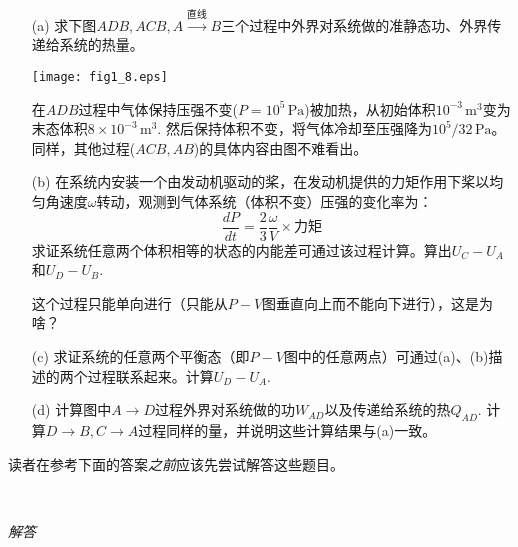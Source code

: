\begin{enumerate}
	\item[(a)] 求下图$ADB, ACB, A \stackrel{ \text{直线} }{\longrightarrow} B$三个过程中外界对系统做的准静态功、外界传递给系统的热量。


	{
		\centering
		\texttt{[image: fig1\_8.eps]}
		\notag
	}

	在$ADB$过程中气体保持压强不变($P = 10^5 \, \mathrm{Pa}$)被加热，从初始体积$10^{-3} \, \mathrm{m}^3$变为末态体积$8 \times 10^{-3} \, \mathrm{m}^3$. 然后保持体积不变，将气体冷却至压强降为$10^5 / 32 \, \mathrm{Pa}$。同样，其他过程($ACB, AB$)的具体内容由图不难看出。

	\item[(b)] 在系统内安装一个由发动机驱动的桨，在发动机提供的力矩作用下桨以均匀角速度$\omega$转动，观测到气体系统（体积不变）压强的变化率为：
	\[
		\frac{dP}{dt} = \frac{2}{3} \frac{\omega}{V} \times \text{力矩}
	\]
	求证系统任意两个体积相等的状态的内能差可通过该过程计算。算出$U_C - U_A$和$U_D - U_B$.

	这个过程只能单向进行（只能从$P-V$图垂直向上而不能向下进行），这是为啥？

	\item[(c)] 求证系统的任意两个平衡态（即$P-V$图中的任意两点）可通过(a)、(b)描述的两个过程联系起来。计算$U_D - U_A$.

	\item[(d)] 计算图中$A \to D$过程外界对系统做的功$W_{AD}$以及传递给系统的热$Q_{AD}$. 计算$D \to B, C \to A$过程同样的量，并说明这些计算结果与(a)一致。
\end{enumerate}

读者在参考下面的答案{\it 之前}应该先尝试解答这些题目。

\ 

{\it \large 解答}

